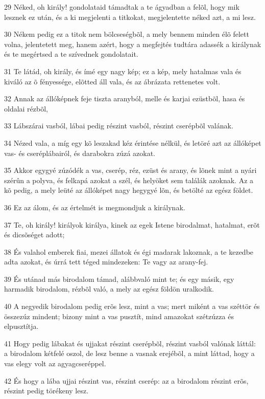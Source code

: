 \par 29 Néked, oh király! gondolataid támadtak a te ágyadban a felõl, hogy mik lesznek ez után, és a ki megjelenti a titkokat, megjelentette néked azt, a mi lesz.
\par 30 Nékem pedig ez a titok nem bölcseségbõl, a mely bennem minden élõ felett volna, jelentetett meg, hanem azért, hogy a megfejtés tudtára adassék a királynak és te megértsed a te szívednek gondolatait.
\par 31 Te látád, oh király, és ímé egy nagy kép; ez a kép, mely hatalmas vala és kiváló az õ fényessége, elõtted áll vala, és az ábrázata rettenetes volt.
\par 32 Annak az állóképnek feje tiszta aranyból, melle és karjai ezüstbõl, hasa és oldalai rézbõl,
\par 33 Lábszárai vasból, lábai pedig részint vasból, részint cserépbõl valának.
\par 34 Nézed vala, a míg egy kõ leszakad kéz érintése nélkül, és letöré azt az állóképet vas- és cseréplábairól, és darabokra zúzá azokat.
\par 35 Akkor egygyé zúzódék a vas, cserép, réz, ezüst és arany, és lõnek mint a nyári szérûn a polyva, és felkapá azokat a szél, és helyöket sem találák azoknak. Az a kõ pedig, a mely leüté az állóképet nagy hegygyé lõn, és betölté az egész földet.
\par 36 Ez az álom, és az értelmét is megmondjuk a királynak.
\par 37 Te, oh király! királyok királya, kinek az egek Istene birodalmat, hatalmat, erõt és dicsõséget adott;
\par 38 És valahol emberek fiai, mezei állatok és égi madarak lakoznak, a te kezedbe adta azokat, és úrrá tett téged mindezeken: Te vagy az arany-fej.
\par 39 És utánad más birodalom támad, alábbvaló mint te; és egy másik, egy harmadik birodalom, rézbõl való, a mely az egész földön uralkodik.
\par 40 A negyedik birodalom pedig erõs lesz, mint a vas; mert miként a vas széttör és összezúz mindent; bizony mint a vas pusztít, mind amazokat szétzúzza és elpusztítja.
\par 41 Hogy pedig lábakat és ujjakat részint cserépbõl, részint vasból valónak láttál: a birodalom kétfelé oszol, de lesz benne a vasnak erejébõl, a mint láttad, hogy a vas elegy volt az agyagcseréppel.
\par 42 És hogy a lába ujjai részint vas, részint cserép: az a birodalom részint erõs, részint pedig törékeny lesz.
